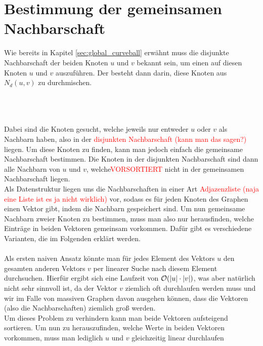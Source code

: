  

\section{Bestimmung der gemeinsamen Nachbarschaft}

Wie bereits in Kapitel \ref{sec:global_curveball} erwähnt muss die disjunkte Nachbarschaft
der beiden Knoten $u$ und $v$ bekannt sein, um einen \ct{} auf diesen Knoten $u$ und $v$
auszuführen. Der \ct{} besteht dann darin, diese Knoten aus $N_{d}(u,v)$ zu durchmischen.

~\\
\\
\\
Dabei sind die Knoten gesucht, 
welche jeweils nur entweder $u$ oder $v$ als Nachbarn haben, also in der \textcolor{red}{disjunkten Nachbarschaft (kann man das sagen?)} liegen.
Um diese Knoten zu finden, kann man jedoch einfach die gemeinsame Nachbarschaft bestimmen. Die Knoten
in der disjunkten Nachbarschaft sind dann alle Nachbarn von $u$ und $v$, welche\textcolor{red}{VORSORTIERT}
 nicht in der gemeinsamen
Nachbarschaft liegen. 
\\
Als Datenstruktur liegen uns die Nachbarschaften in einer Art \textcolor{red}{Adjazenzliste (naja eine Liste ist es ja nicht wirklich)}
vor, sodass es für jeden Knoten des Graphen einen Vektor gibt, indem die Nachbarn gespeichert sind.
Um nun gemeinsame Nachbarn
zweier Knoten zu bestimmen, muss man also nur herausfinden, welche Einträge in beiden Vektoren gemeinsam
vorkommen. Dafür gibt es verschiedene Varianten, die 
im Folgenden erklärt werden.
\\
\\
Als ersten \glqq naiven\grqq{} Ansatz könnte man für jedes Element des Vektors $u$ den gesamten anderen 
Vektors $v$ per linearer Suche nach diesem Element durchsuchen. Hierfür ergibt sich eine Laufzeit von
$\mathcal{O}(|u|\cdot|v|)$, was aber natürlich nicht sehr sinnvoll ist, da der Vektor $v$ ziemlich oft 
durchlaufen werden muss und wir 
im Falle von massiven Graphen davon ausgehen können, dass die Vektoren (also die Nachbarschaften)
ziemlich groß werden. 
\\
Um dieses Problem zu verhindern kann man beide Vektoren aufsteigend sortieren. Um nun zu herauszufinden,
welche Werte in beiden Vektoren vorkommen, muss man lediglich $u$ und $v$ gleichzeitig linear durchlaufen
